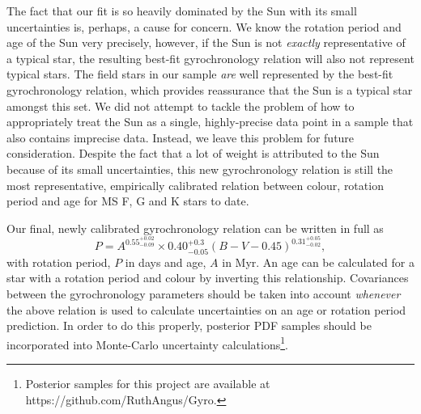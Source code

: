\documentclass[useAMS, usenatbib]{mn2e}
\newcommand{\logg}{log \emph{g}}
\newcommand{\subcut}{4.2~}
\newcommand{\gyroa}{0.40}
\newcommand{\aerrp}{0.3}
\newcommand{\aerrm}{0.05}
\newcommand{\gyron}{0.55}
\newcommand{\nerrp}{0.02}
\newcommand{\nerrm}{0.09}
\newcommand{\gyrob}{0.31}
\newcommand{\berrp}{0.05}
\newcommand{\berrm}{0.02}
\begin{document}
The fact that our fit is so heavily dominated by the Sun with its small
uncertainties is, perhaps, a cause for concern.
We know the rotation period and age of the Sun very precisely, however, if the
Sun is not \emph{exactly} representative of a typical star, the resulting
best-fit gyrochronology relation will also not represent typical stars.
The field stars in our sample \emph{are} well represented by the best-fit
gyrochronology relation, which provides reassurance that the Sun is a typical
star amongst this set.
We did not attempt to tackle the problem of how to appropriately treat the Sun
as a single, highly-precise data point in a sample that also contains imprecise
data.
Instead, we leave this problem for future consideration.
Despite the fact that a lot of weight is attributed to the Sun because of its
small uncertainties, this new gyrochronology relation is still the most
representative, empirically calibrated relation between colour, rotation period
and age for MS F, G and K stars to date. %

Our final, newly calibrated gyrochronology relation can be written in full as
\begin{equation}
	P = A^{\gyron^{+\nerrp}_{-\nerrm}} \times \gyroa^{+\aerrp}_{-\aerrm}
	(B-V-0.45)^{\gyrob^{+\berrp}_{-\berrm}},
\label{eq:Barnes2007_3}
\end{equation}
with rotation period, $P$ in days and age, $A$ in Myr.
An age can be calculated for a star with a rotation period and colour by
inverting this relationship.
Covariances between the gyrochronology parameters should
be taken into account {\it whenever} the above relation is used to calculate
uncertainties on an age or rotation period prediction.
In order to do this properly, posterior PDF samples should be incorporated
into Monte-Carlo uncertainty calculations\footnote{Posterior samples for
this project are available at https://github.com/RuthAngus/Gyro.}.
\end{document}
